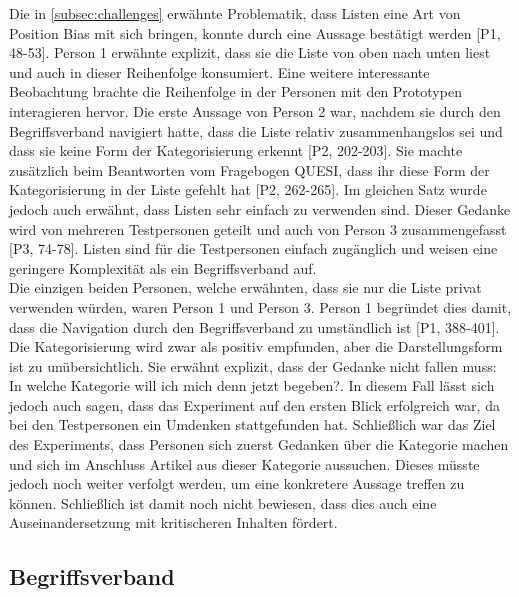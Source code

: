Die in \autoref{subsec:challenges} erwähnte Problematik, dass Listen eine Art von Position Bias mit sich bringen, konnte durch eine Aussage bestätigt werden [P1, 48-53].
Person 1 erwähnte explizit, dass sie die Liste von oben nach unten liest und auch in dieser Reihenfolge konsumiert.
Eine weitere interessante Beobachtung brachte die Reihenfolge in der Personen mit den Prototypen interagieren hervor.
Die erste Aussage von Person 2 war, nachdem sie durch den Begriffsverband navigiert hatte, dass die Liste \glqq relativ zusammenhangslos\grqq{} sei und dass sie keine Form der Kategorisierung erkennt [P2, 202-203].
Sie machte zusätzlich beim Beantworten vom Fragebogen \ac{QUESI}, dass ihr diese Form der Kategorisierung in der Liste gefehlt hat [P2, 262-265].
Im gleichen Satz wurde jedoch auch erwähnt, dass Listen sehr einfach zu verwenden sind.
Dieser Gedanke wird von mehreren Testpersonen geteilt und auch von Person 3 zusammengefasst [P3, 74-78].
Listen sind für die Testpersonen einfach zugänglich und weisen eine geringere Komplexität als ein Begriffsverband auf.\\

Die einzigen beiden Personen, welche erwähnten, dass sie nur die Liste privat verwenden würden, waren Person 1 und Person 3.
Person 1 begründet dies damit, dass die Navigation durch den Begriffsverband zu umständlich ist [P1, 388-401]. 
Die Kategorisierung wird zwar als positiv empfunden, aber die Darstellungsform ist zu unübersichtlich.
Sie erwähnt explizit, dass der Gedanke nicht fallen muss: \glqq In welche Kategorie will ich mich denn jetzt begeben?\grqq{}.
In diesem Fall lässt sich jedoch auch sagen, dass das Experiment auf den ersten Blick erfolgreich war, da bei den Testpersonen ein Umdenken stattgefunden hat.
Schließlich war das Ziel des Experiments, dass Personen sich zuerst Gedanken über die Kategorie machen und sich im Anschluss Artikel aus dieser Kategorie aussuchen.
Dieses müsste jedoch noch weiter verfolgt werden, um eine konkretere Aussage treffen zu können.
Schließlich ist damit noch nicht bewiesen, dass dies auch eine Auseinandersetzung mit kritischeren Inhalten fördert.


\subsection{Begriffsverband}

